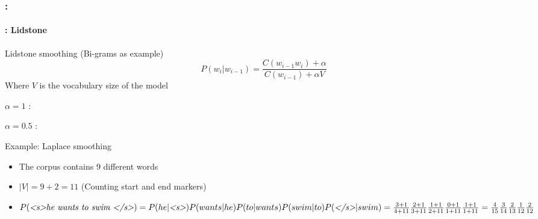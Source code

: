 \documentclass[xcolor=table]{beamer}
\begin{document}
\begin{frame}
	\frametitle{\insertshortsubtitle: \insertsection}
	\framesubtitle{\insertsubsection: Lidstone}

	\vspace{-6pt}
	\begin{block}{Lidstone smoothing (Bi-grams as example)}
		\[%
		P(w_i | w_{i-1}) = \frac{C(w_{i-1} w_i) + \alpha}{C(w_{i-1}) + \alpha V}
		\]
		Where $V$ is the vocabulary size of the model
		
		$\alpha = 1$ :  
		
		$\alpha = 0.5$ : 
	\end{block}
	
	\vspace{-6pt}
	\begin{exampleblock}{Example: Laplace smoothing}
		\begin{itemize}
			\item The corpus contains 9 different words
			\item $|V| = 9 + 2 = 11$ (Counting start and end markers)
			\item $P(\text{\textit{\textless s\textgreater he wants to swim \textless/s\textgreater}}) = 
			P(he|\text{\textit{\textless s\textgreater}}) P(wants|he) P(to|wants) P(swim|to) P(\text{\textit{\textless/s\textgreater}}|swim) = 
			\frac{3 + 1}{4 + 11} \frac{2 + 1}{3 + 11} \frac{1 + 1}{2 + 11} \frac{0 + 1}{1 + 11} \frac{1 + 1}{1 + 11}
			= \frac{4}{15} \frac{3}{14} \frac{2}{13} \frac{1}{12} \frac{2}{12} $
		\end{itemize}
	\end{exampleblock}

\end{frame}
\end{document}
